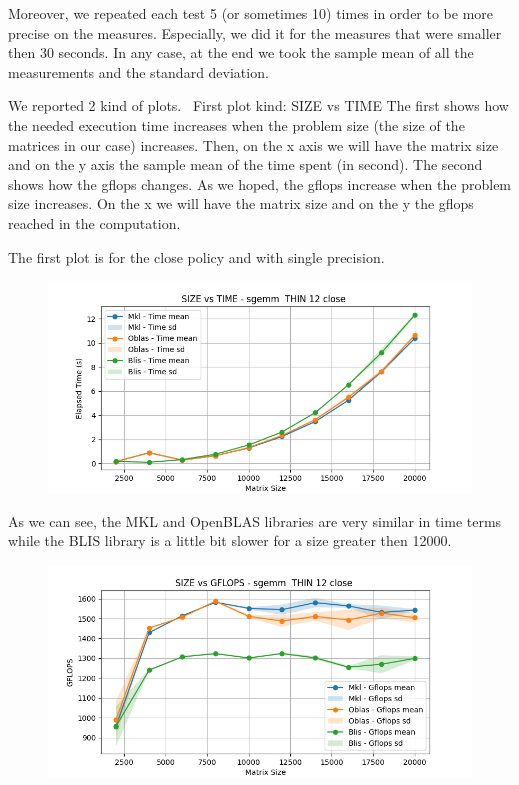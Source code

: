 \documentclass[12pt, titlepage]{report}
\begin{document}
Moreover, we repeated each test 5 (or sometimes 10) times in order to be more precise on the measures. Especially, we did it for the measures that were smaller then 30 seconds. 
In any case, at the end we took the sample mean of all the measurements and the standard deviation.

We reported 2 kind of plots. \
First plot kind: SIZE vs TIME
The first shows how the needed execution time increases when the problem size (the size of the matrices in our case) increases.
Then, on the x axis we will have the matrix size and on the y axis the sample mean of the time spent (in second).
The second shows how the gflops changes. As we hoped, the gflops increase when the problem size increases. On the x we will have the matrix size and on the y the gflops reached in the computation.

The first plot is for the close policy and with single precision.
\begin{figure}[H]
    \centering
    \includegraphics[width=\textwidth]{THIN 12/sgemm__THIN_12_close_time.png}
\end{figure}

As we can see, the MKL and OpenBLAS libraries are very similar in time terms while the BLIS library is a little bit slower for a size greater then 12000.

\begin{figure}[H]
    \centering
    \includegraphics[width=\textwidth]{THIN 12/sgemm__THIN_12_close_gflops.png}
\end{figure}
\end{document}

